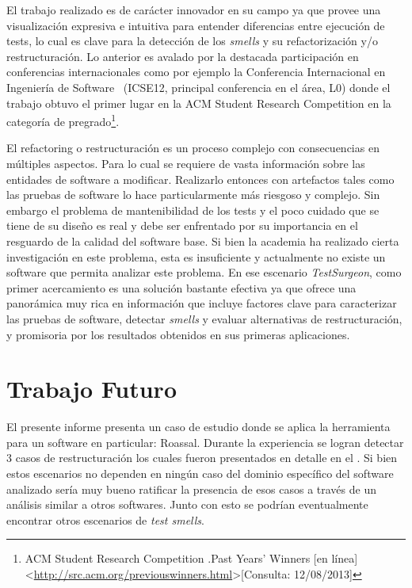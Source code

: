 \par El trabajo realizado es de carácter innovador en su campo ya que provee una visualización expresiva e intuitiva para entender diferencias entre ejecución de tests, lo cual es clave para la detección de los \emph{smells} y su refactorización y/o restructuración. Lo anterior es avalado por la destacada participación en conferencias internacionales como por ejemplo la Conferencia Internacional en Ingeniería de Software~\cite{Este12a} (ICSE12, principal conferencia en el área, L0) donde el trabajo obtuvo el primer lugar en la ACM Student Research Competition  en la categoría de pregrado\footnote{ACM Student Research Competition .Past Years' Winners [en línea] \textless\url{http://src.acm.org/previouswinners.html}\textgreater [Consulta: 12/08/2013]}.  

\par El refactoring o restructuración es un proceso complejo con consecuencias en múltiples aspectos. Para lo cual se requiere de vasta información sobre las entidades de software a modificar. Realizarlo entonces con artefactos tales como las pruebas de software lo hace particularmente más riesgoso y complejo. Sin embargo el problema de mantenibilidad de los tests y el poco cuidado que se tiene de su diseño es real y debe ser enfrentado por su importancia en el resguardo de la calidad del software base. Si bien la academia ha realizado cierta investigación en este problema, esta es insuficiente y actualmente no existe un software que permita analizar este problema. En ese escenario \emph{TestSurgeon}, como primer acercamiento es una solución bastante efectiva ya que ofrece una panorámica muy rica en información que incluye factores clave para caracterizar las pruebas de software, detectar \emph{smells} y evaluar alternativas de restructuración, y promisoria por los resultados obtenidos en sus primeras aplicaciones.


\section{Trabajo Futuro}

\par El presente informe presenta un caso de estudio donde se aplica la herramienta para un software en particular: Roassal. Durante la experiencia se logran detectar 3 casos de restructuración los cuales fueron presentados en detalle en el . Si bien estos escenarios no dependen en ningún caso del dominio específico del software analizado sería muy bueno ratificar la presencia de esos casos a través de un análisis similar a otros softwares. Junto con esto se podrían eventualmente encontrar otros escenarios de \emph{test smells}.

